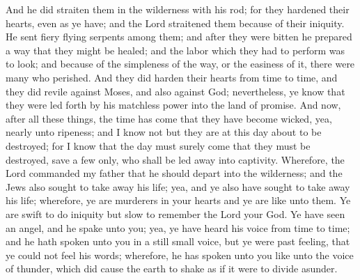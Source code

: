 And he did straiten them in the wilderness with his rod; for they hardened their hearts, even as ye have; and the Lord straitened them because of their iniquity. He sent fiery flying serpents among them; and after they were bitten he prepared a way that they might be healed; and the labor which they had to perform was to look; and because of the simpleness of the way, or the easiness of it, there were many who perished.
\bverse \iffalse And they did harden their hearts from time to time, and they did revile against Moses, and also against God; nevertheless, ye know that they were led forth by his matchless power into the land of promise. \fi
And they did harden their hearts from time to time, and they did revile against Moses, and also against God; nevertheless, ye know that they were led forth by his matchless power into the land of promise.
\bverse \iffalse And now, after all these things, the time has come that they have become wicked, yea, nearly unto ripeness; and I know not but they are at this day about to be destroyed; for I know that the day must surely come that they must be destroyed, save a few only, who shall be led away into captivity. \fi
And now, after all these things, the time has come that they have become wicked, yea, nearly unto ripeness; and I know not but they are at this day about to be destroyed; for I know that the day must surely come that they must be destroyed, save a few only, who shall be led away into captivity.
\bverse \iffalse Wherefore, the Lord commanded my father that he should depart into the wilderness; and the Jews also sought to take away his life; yea, and ye also have sought to take away his life; wherefore, ye are murderers in your hearts and ye are like unto them. \fi
Wherefore, the Lord commanded my father that he should depart into the wilderness; and the Jews also sought to take away his life; yea, and ye also have sought to take away his life; wherefore, ye are murderers in your hearts and ye are like unto them.
\bverse \iffalse Ye are swift to do iniquity but slow to remember the Lord your God. Ye have seen an angel, and he spake unto you; yea, ye have heard his voice from time to time; and he hath spoken unto you in a still small voice, but ye were past feeling, that ye could not feel his words; wherefore, he has spoken unto you like unto the voice of thunder, which did cause the earth to shake as if it were to divide asunder. \fi
Ye are swift to do iniquity but slow to remember the Lord your God. Ye have seen an angel, and he spake unto you; yea, ye have heard his voice from time to time; and he hath spoken unto you in a still small voice, but ye were past feeling, that ye could not feel his words; wherefore, he has spoken unto you like unto the voice of thunder, which did cause the earth to shake as if it were to divide asunder.
